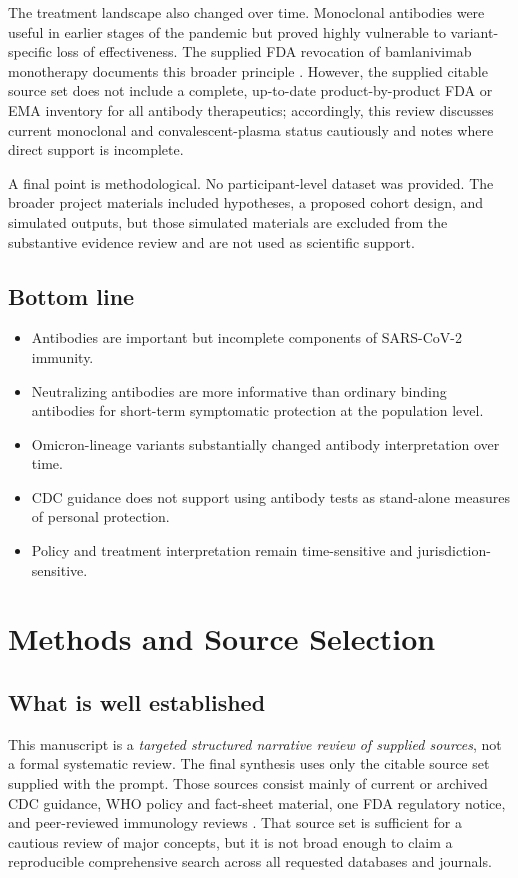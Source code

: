 \documentclass[12pt]{article}
\begin{document}
The treatment landscape also changed over time. Monoclonal antibodies were useful in earlier stages of the pandemic but proved highly vulnerable to variant-specific loss of effectiveness. The supplied FDA revocation of bamlanivimab monotherapy documents this broader principle \cite{ref6}. However, the supplied citable source set does not include a complete, up-to-date product-by-product FDA or EMA inventory for all antibody therapeutics; accordingly, this review discusses current monoclonal and convalescent-plasma status cautiously and notes where direct support is incomplete.

A final point is methodological. No participant-level dataset was provided. The broader project materials included hypotheses, a proposed cohort design, and simulated outputs, but those simulated materials are excluded from the substantive evidence review and are not used as scientific support.

\subsection*{Bottom line}
\begin{itemize}[leftmargin=1.5em]
    \item Antibodies are important but incomplete components of SARS-CoV-2 immunity.
    \item Neutralizing antibodies are more informative than ordinary binding antibodies for short-term symptomatic protection at the population level.
    \item Omicron-lineage variants substantially changed antibody interpretation over time.
    \item CDC guidance does not support using antibody tests as stand-alone measures of personal protection.
    \item Policy and treatment interpretation remain time-sensitive and jurisdiction-sensitive.
\end{itemize}

\section{Methods and Source Selection}
\subsection*{What is well established}
This manuscript is a \emph{targeted structured narrative review of supplied sources}, not a formal systematic review. The final synthesis uses only the citable source set supplied with the prompt. Those sources consist mainly of current or archived CDC guidance, WHO policy and fact-sheet material, one FDA regulatory notice, and peer-reviewed immunology reviews \cite{ref1,ref2,ref3,ref4,ref5,ref6,ref7,ref8,ref9,ref10,ref11,ref12}. That source set is sufficient for a cautious review of major concepts, but it is not broad enough to claim a reproducible comprehensive search across all requested databases and journals.
\end{document}
